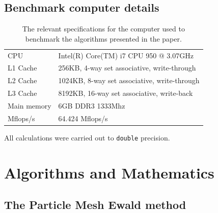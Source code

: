 \documentclass[pdftex,twoside,a4paper]{report}
\newcommand{\pmem}{Particle Mesh Ewald method}
\begin{document}
\section{Benchmark computer details}
\begin{table}[h]

    \begin{tabular}{l|l}
        CPU         & Intel(R) Core(TM) i7 CPU 950  @ 3.07GHz        \\ 
        L1 Cache                               & 256KB, 4-way set associative, write-through             \\ 
        L2 Cache                               & 1024KB, 8-way set associative, write-through \\
        L3 Cache                               & 8192KB, 16-way set associative, write-back \\ 
        Main memory                            & 6GB DDR3 1333Mhz\\ 
        Mflops/s                               & 64.424 Mflops/s
    \end{tabular}
    \caption{The relevant specifications for the computer used to benchmark the algorithms presented in the paper.}
\end{table}

All calculations were carried out to \texttt{double} precision.


\chapter{Algorithms and Mathematics}
\label{ap:math}
\section{The \pmem{}}
\end{document}
